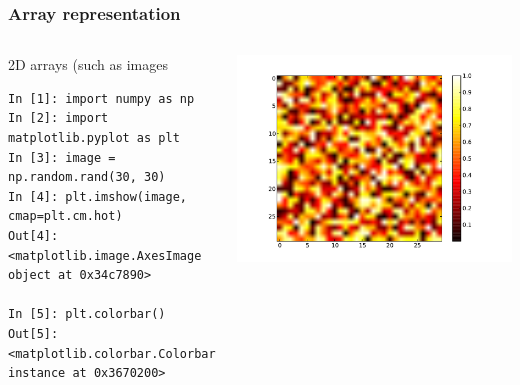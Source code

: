 \documentclass[colorlinks]{beamer}
\begin{document}
\begin{frame}[fragile]\frametitle{Array representation}
\begin{columns}[c]
\begin{block}{2D arrays (such as images}
\tiny
\begin{verbatim}
In [1]: import numpy as np 
In [2]: import matplotlib.pyplot as plt 
In [3]: image = np.random.rand(30, 30) 
In [4]: plt.imshow(image, cmap=plt.cm.hot)     
Out[4]: <matplotlib.image.AxesImage object at 0x34c7890>

In [5]: plt.colorbar()     
Out[5]: <matplotlib.colorbar.Colorbar instance at 0x3670200>

\end{verbatim}

\end{block}


\includegraphics[width=\textwidth]{plwfigis/CursP_2_figure4}

     
\end{columns}
\end{frame}
\end{document}
